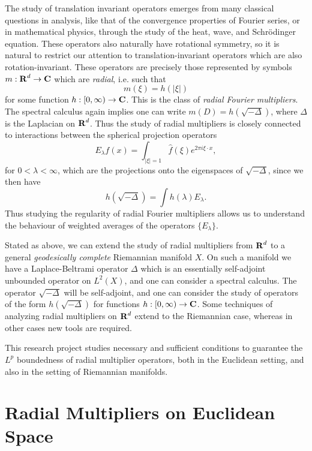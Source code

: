 The study of translation invariant operators emerges from many classical questions in analysis, like that of the convergence properties of Fourier series, or in mathematical physics, through the study of the heat, wave, and Schr\"{o}dinger equation. These operators also naturally have rotational symmetry, so it is natural to restrict our attention to translation-invariant operators which are also rotation-invariant. These operators are precisely those represented by symbols $m: \operatorname{\mathbf{R}}^d \to \operatorname{\mathbf{C}}$ which are \emph{radial}, i.e. such that
%
\[ m(\xi) = h(|\xi|) \]
%
for some function $h: [0,\infty) \to \operatorname{\mathbf{C}}$. This is the class of \emph{radial Fourier multipliers}. The spectral calculus again implies one can write $m(D) = h(\sqrt{-\Delta})$, where $\Delta$ is the Laplacian on $\operatorname{\mathbf{R}}^d$. Thus the study of radial multipliers is closely connected to interactions between the spherical projection operators
%
\[ E_\lambda f(x) = \int_{|\xi| = 1} \widehat{f}(\xi) e^{2 \pi i \xi \cdot x}, \]
%
for $0 < \lambda < \infty$, which are the projections onto the eigenspaces of $\sqrt{-\Delta}$, since we then have
%
\[ h(\sqrt{-\Delta}) = \int h(\lambda) E_\lambda. \]
%
Thus studying the regularity of radial Fourier multipliers allows us to understand the behaviour of weighted averages of the operators $\{ E_\lambda \}$.

Stated as above, we can extend the study of radial multipliers from $\operatorname{\mathbf{R}}^d$ to a general \emph{geodesically complete} Riemannian manifold $X$. On such a manifold we have a Laplace-Beltrami operator $\Delta$ which is an essentially self-adjoint unbounded operator on $L^2(X)$, and one can consider a spectral calculus. The operator $\sqrt{-\Delta}$ will be self-adjoint, and one can consider the study of operators of the form $h(\sqrt{-\Delta})$ for functions $h: [0,\infty) \to \operatorname{\mathbf{C}}$. Some techniques of analyzing radial multipliers on $\operatorname{\mathbf{R}}^d$ extend to the Riemannian case, whereas in other cases new tools are required.

This research project studies necessary and sufficient conditions to guarantee the $L^p$ boundedness of radial multiplier operators, both in the Euclidean setting, and also in the setting of Riemannian manifolds. %


\section{Radial Multipliers on Euclidean Space}

